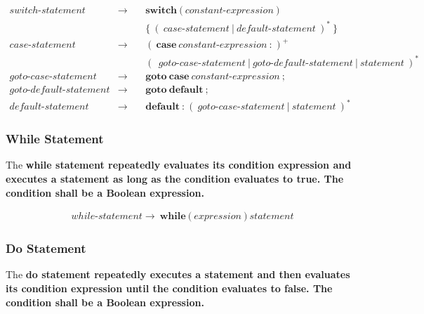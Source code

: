 \documentclass[a4paper,oneside,11pt]{article}
\begin{document}
\begin{align*}
switch\textrm{-}statement &\rightarrow \> & &\textbf{switch} \> \texttt{(} \> \hyperref[constantexp]{constant\textrm{-}expression} \> \texttt{)}\\
& & &\texttt{\{} \> ( \> case\textrm{-}statement \> | \> default\textrm{-}statement \>)^* \> \texttt{\}}\\
case\textrm{-}statement &\rightarrow \> & &( \> \textbf{case} \> \hyperref[constantexpr]{constant\textrm{-}expression} \> \texttt{:} \> )^+\\
& & &( \>  \> goto\textrm{-}case\textrm{-}statement \> | \> goto\textrm{-}default\textrm{-}statement \> | \> \hyperref[statement]{statement} \>)^*\\
goto\textrm{-}case\textrm{-}statement &\rightarrow & &\textbf{goto} \> \textbf{case} \> \hyperref[constantexpr]{constant\textrm{-}expression} \> \texttt{;}\\
goto\textrm{-}default\textrm{-}statement & \rightarrow & &\textbf{goto} \> \textbf{default} \> \texttt{;}\\
default\textrm{-}statement & \rightarrow & &\textbf{default} \> \texttt{:} \> ( \>
goto\textrm{-}case\textrm{-}statement \> | \> \hyperref[statement]{statement} \> )^*
\end{align*}

\subsubsection{While Statement}\label{whilestatement}

The \bf{while} statement repeatedly evaluates its condition expression and executes a statement as long as the condition evaluates to \bf{true}.
The condition shall be a Boolean expression.

\begin{align*}
while\textrm{-}statement \rightarrow \> \textbf{while} \> \texttt{(} \> \hyperref[expression]{expression} \> \texttt{)} \> \hyperref[statement]{statement}
\end{align*}

\subsubsection{Do Statement}\label{dostatement}

The \bf{do} statement repeatedly executes a statement and then evaluates its condition expression until the condition evaluates to \bf{false}.
The condition shall be a Boolean expression.
\end{document}
